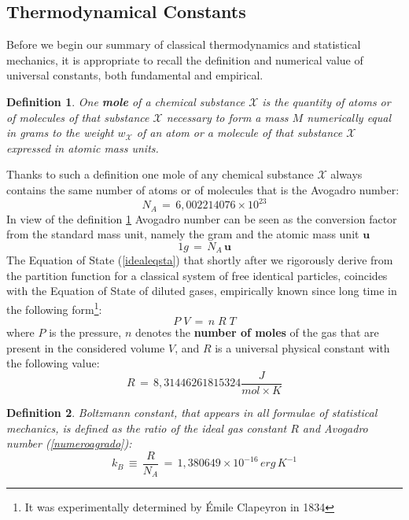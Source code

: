 \documentclass[10pt,a4paper]{article}
\newtheorem{definizione}{Definition}[section]
\begin{document}
\subsection{Thermodynamical Constants}
Before we begin our summary of classical thermodynamics and statistical mechanics, it is appropriate to recall the definition and numerical value of universal constants, both fundamental and empirical.
\begin{definizione}
\label{mole} One \textbf{mole} of a chemical substance $\mathcal{X}$ is
the quantity of  atoms or of molecules of that substance $\mathcal{X}$
necessary to form  a mass $\mathit{M}$  numerically equal in grams
to the weight  $w_\mathcal{X}$  of an atom or a  molecule of that substance
$\mathcal{X}$ expressed in atomic mass units.
\end{definizione}
Thanks to such a  definition one mole of any chemical substance
$\mathcal{X}$ always contains the same number of atoms or of
molecules that is the Avogadro number:
\begin{equation}\label{numeroagrado}
    N_A \, = \, 6,002214076 \times 10^{23}
\end{equation}
In view of the definition \ref{mole}  Avogadro number can be seen as the conversion factor  from the standard  mass unit, namely the gram and the atomic mass unit $\mathbf{u}$
\begin{equation}\label{conversiaconavo}
    1 g \, = \, N_A \, \mathbf{u}
\end{equation}
The Equation of State  (\ref{idealeqsta}) that  shortly after we  rigorously derive
from the partition function for a classical system of free identical particles,
coincides with the Equation of State of diluted gases, empirically known since long time
in the following form\footnote{It was experimentally determined  by \'{E}mile
Clapeyron in 1834}:
\begin{equation}\label{rudinosco}
    P\;V \, = \, n \; R \; T
\end{equation}
where $P$ is the pressure, $n$ denotes the \textbf{number of moles} of the gas that are present in the considered volume $V$,
and  $R$ is a universal physical constant with the following value:
\begin{equation}\label{valorediR}
    R \, = \, 8,31446261815324 \frac{J}{mol \times K}
\end{equation}
\begin{definizione}
\label{bolzmanno} Boltzmann constant, that appears in all formulae of
statistical mechanics, is  defined as
the ratio of the ideal gas constant $R$  and Avogadro number
(\ref{numeroagrado}):
\begin{equation}\label{kBdefi}
    k_B \, \equiv \, \frac{R}{N_A} \, = \, 1,380649 \times 10^{-16}
    \, erg \, K^{-1}
\end{equation}
\end{definizione}
\end{document}
